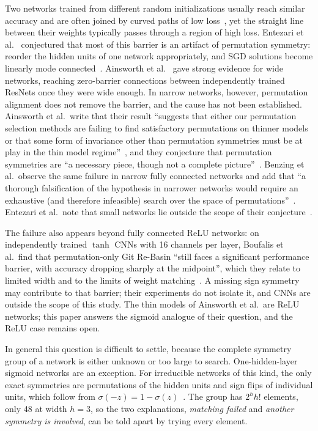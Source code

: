 \documentclass[11pt]{article}
\begin{document}
Two networks trained from different random initializations usually reach similar accuracy and are often joined by curved paths of low loss~\cite{garipov2018loss,draxler2018essentially}, yet the straight line between their weights typically passes through a region of high loss. Entezari et al.~\cite{entezari2022role} conjectured that most of this barrier is an artifact of permutation symmetry: reorder the hidden units of one network appropriately, and SGD solutions become linearly mode connected~\cite{frankle2020linear}. Ainsworth et al.~\cite{ainsworth2023git} gave strong evidence for wide networks, reaching zero-barrier connections between independently trained ResNets once they were wide enough. In narrow networks, however, permutation alignment does not remove the barrier, and the cause has not been established. Ainsworth et al.\ write that their result ``suggests that either our permutation selection methods are failing to find satisfactory permutations on thinner models or that some form of invariance other than permutation symmetries must be at play in the thin model regime''~\cite[Section~5.3]{ainsworth2023git}, and they conjecture that permutation symmetries are ``a necessary piece, though not a complete picture''~\cite[Section~7]{ainsworth2023git}. Benzing et al.\ observe the same failure in narrow fully connected networks and add that ``a thorough falsification of the hypothesis in narrower networks would require an exhaustive (and therefore infeasible) search over the space of permutations''~\cite[Section~3.1]{benzing2022random}. Entezari et al.\ note that small networks lie outside the scope of their conjecture~\cite[Section~3.4]{entezari2022role}.

The failure also appears beyond fully connected ReLU networks: on independently trained $\tanh$ CNNs with 16 channels per layer, Boufalis et al.\ find that permutation-only Git Re-Basin ``still faces a significant performance barrier, with accuracy dropping sharply at the midpoint'', which they relate to limited width and to the limits of weight matching~\cite[Section~5.2]{boufalis2025symmetry}. A missing sign symmetry may contribute to that barrier; their experiments do not isolate it, and CNNs are outside the scope of this study. The thin models of Ainsworth et al.\ are ReLU networks; this paper answers the sigmoid analogue of their question, and the ReLU case remains open.

In general this question is difficult to settle, because the complete symmetry group of a network is either unknown or too large to search. One-hidden-layer sigmoid networks are an exception. For irreducible networks of this kind, the only exact symmetries are permutations of the hidden units and sign flips of individual units, which follow from $\sigma(-z) = 1 - \sigma(z)$~\cite{sussmann1992uniqueness,vlacic2020affine}. The group has $2^h h!$ elements, only 48 at width $h=3$, so the two explanations, \emph{matching failed} and \emph{another symmetry is involved}, can be told apart by trying every element.
\end{document}
